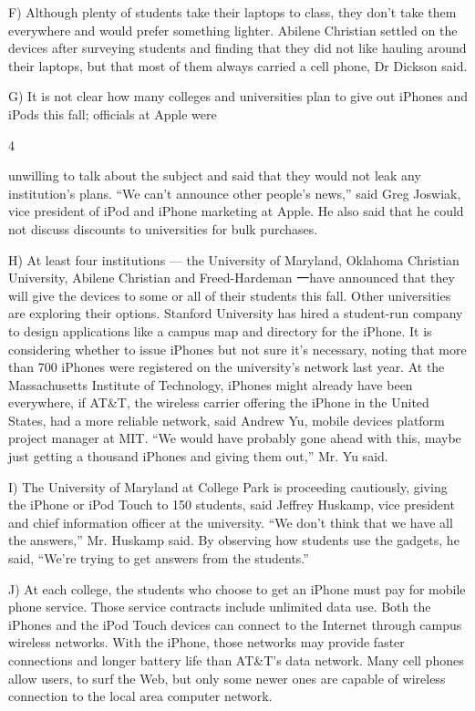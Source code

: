 \documentclass[UTF8,11pt]{ctexart}
\begin{document}
F) Although plenty of students take their laptops to class, they don’t take them everywhere and would prefer something lighter. Abilene Christian settled on the devices after surveying students and finding that they did not like hauling around their laptops, but that most of them always carried a cell phone, Dr Dickson said.


G) It is not clear how many colleges and universities plan to give out iPhones and iPods this fall; officials at Apple were


4


unwilling to talk about the subject and said that they would not leak any institution’s plans. “We can’t announce other people’s news,” said Greg Joswiak, vice president of iPod and iPhone marketing at Apple. He also said that he could not discuss discounts to universities for bulk purchases.


H) At least four institutions — the University of Maryland, Oklahoma Christian University, Abilene Christian and Freed-Hardeman 一have announced that they will give the devices to some or all of their students this fall. Other universities are exploring their options. Stanford University has hired a student-run company to design applications like a campus map and directory for the iPhone. It is considering whether to issue iPhones but not sure it’s necessary, noting that more than 700 iPhones were registered on the university’s network last year. At the Massachusetts Institute of Technology, iPhones might already have been everywhere, if AT\&T, the wireless carrier offering the iPhone in the United States, had a more reliable network, said Andrew Yu, mobile devices platform project manager at MIT. “We would have probably gone ahead with this, maybe just getting a thousand iPhones and giving them out,” Mr. Yu said.


I) The University of Maryland at College Park is proceeding cautiously, giving the iPhone or iPod Touch to 150 students, said Jeffrey Huskamp, vice president and chief information officer at the university. “We don’t think that we have all the answers,” Mr. Huskamp said. By observing how students use the gadgets, he said, “We’re trying to get answers from the students.”


J) At each college, the students who choose to get an iPhone must pay for mobile phone service. Those service contracts include unlimited data use. Both the iPhones and the iPod Touch devices can connect to the Internet through campus wireless networks. With the iPhone, those networks may provide faster connections and longer battery life than AT\&T’s data network. Many cell phones allow users, to surf the Web, but only some newer ones are capable of wireless connection to the local area computer network.
\end{document}
